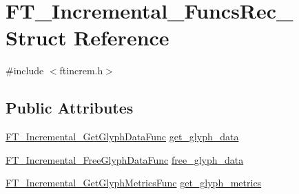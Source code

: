 \hypertarget{struct_f_t___incremental___funcs_rec__}{\section{F\-T\-\_\-\-Incremental\-\_\-\-Funcs\-Rec\-\_\- Struct Reference}
\label{struct_f_t___incremental___funcs_rec__}
}


{\ttfamily \#include $<$ftincrem.\-h$>$}

\subsection*{Public Attributes}
\begin{DoxyCompactItemize}
\item 
\hyperlink{ftincrem_8h_af7afb4667d1afc6935f1e91c9f97f512}{F\-T\-\_\-\-Incremental\-\_\-\-Get\-Glyph\-Data\-Func} \hyperlink{struct_f_t___incremental___funcs_rec___ac276b7ff9624b8d8bf144ab8d00538b4}{get\-\_\-glyph\-\_\-data}
\item 
\hyperlink{ftincrem_8h_addd27e934242af8636b624105446d7e4}{F\-T\-\_\-\-Incremental\-\_\-\-Free\-Glyph\-Data\-Func} \hyperlink{struct_f_t___incremental___funcs_rec___a9201afcfda8c15be839aee04306dff0a}{free\-\_\-glyph\-\_\-data}
\item 
\hyperlink{ftincrem_8h_af1d4abc74cc5cc57d8937b3e4333aea4}{F\-T\-\_\-\-Incremental\-\_\-\-Get\-Glyph\-Metrics\-Func} \hyperlink{struct_f_t___incremental___funcs_rec___ac7d95e85357ab9d1893660b0628c1908}{get\-\_\-glyph\-\_\-metrics}
\end{DoxyCompactItemize}


